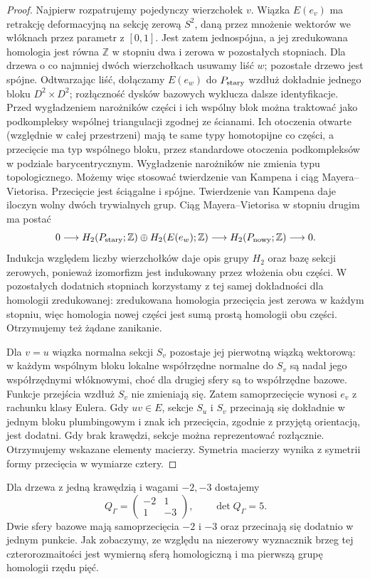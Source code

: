 \begin{proof}
Najpierw rozpatrujemy pojedynczy wierzchołek $v$.
Wiązka $E(e_v)$ ma retrakcję deformacyjną
na sekcję zerową $S^2$, daną przez mnożenie
wektorów we włóknach przez parametr z $[0,1]$.
Jest zatem jednospójna, a jej zredukowana
homologia jest równa $\mathbb Z$ w stopniu
dwa i zerowa w pozostałych stopniach.
Dla drzewa o co najmniej dwóch wierzchołkach
usuwamy liść $w$; pozostałe drzewo jest spójne.
Odtwarzając liść, dołączamy $E(e_w)$ do
$P_{\rm stary}$ wzdłuż dokładnie jednego bloku
$D^2\times D^2$; rozłączność dysków bazowych
wyklucza dalsze identyfikacje.
Przed wygładzeniem narożników części i ich
wspólny blok można traktować jako podkompleksy
wspólnej triangulacji zgodnej ze ścianami.
Ich otoczenia otwarte (względnie w całej
przestrzeni) mają te same typy homotopijne
co części, a przecięcie ma typ wspólnego bloku,
przez standardowe otoczenia podkompleksów
w podziale barycentrycznym. Wygładzenie
narożników nie zmienia typu topologicznego.
Możemy więc stosować twierdzenie van Kampena
i ciąg Mayera--Vietorisa. Przecięcie jest
ściągalne i spójne. Twierdzenie van Kampena
daje iloczyn wolny dwóch trywialnych grup.
Ciąg Mayera--Vietorisa w stopniu drugim ma postać
\[
0\longrightarrow H_2(P_{\rm stary};\mathbb Z)\oplus
H_2(E(e_w);\mathbb Z)\longrightarrow
H_2(P_{\rm nowy};\mathbb Z)\longrightarrow0.
\]
Indukcja względem liczby wierzchołków daje opis grupy
$H_2$ oraz bazę sekcji zerowych, ponieważ
izomorfizm jest indukowany przez włożenia obu
części. W pozostałych dodatnich stopniach
korzystamy z tej samej dokładności dla homologii
zredukowanej: zredukowana homologia przecięcia
jest zerowa w każdym stopniu, więc homologia
nowej części jest sumą prostą homologii obu
części. Otrzymujemy też żądane zanikanie.

Dla $v=u$ wiązka normalna sekcji $S_v$
pozostaje jej pierwotną wiązką wektorową:
w każdym wspólnym bloku lokalne współrzędne
normalne do $S_v$ są nadal jego współrzędnymi
włóknowymi, choć dla drugiej sfery są to
współrzędne bazowe. Funkcje przejścia wzdłuż
$S_v$ nie zmieniają się. Zatem samoprzecięcie
wynosi $e_v$ z rachunku klasy Eulera. Gdy $uv\in E$,
sekcje $S_u$ i $S_v$ przecinają się dokładnie w jednym
bloku plumbingowym i znak ich przecięcia, zgodnie z
przyjętą orientacją, jest dodatni. Gdy brak krawędzi,
sekcje można reprezentować rozłącznie. Otrzymujemy
wskazane elementy macierzy. Symetria macierzy wynika
z symetrii formy przecięcia w wymiarze cztery.
\end{proof}

\begin{przyklad}
Dla drzewa z jedną krawędzią i wagami $-2,-3$ dostajemy
\[
Q_\Gamma=\begin{pmatrix}-2&1\\1&-3\end{pmatrix},
\qquad \det Q_\Gamma=5.
\]
Dwie sfery bazowe mają samoprzecięcia $-2$ i $-3$ oraz
przecinają się dodatnio w jednym punkcie. Jak zobaczymy,
ze względu na niezerowy wyznacznik brzeg tej czterorozmaitości
jest wymierną sferą homologiczną i ma pierwszą grupę homologii
rzędu pięć.
\end{przyklad}

